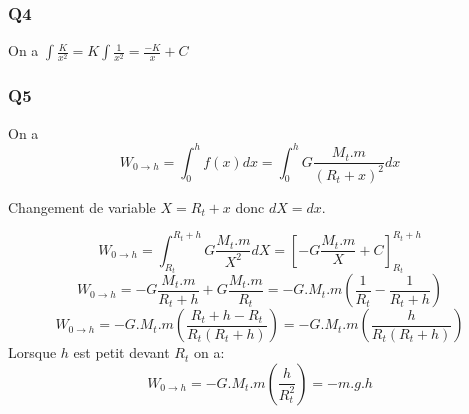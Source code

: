 \documentclass[]{book}
\theoremstyle{definition}
\begin{document}
\subsubsection{Q4}
On a $\int \frac{K}{x^2} = K \int \frac{1}{x^2} = \frac{-K}{x} + C$

\subsubsection{Q5}
On a 
$$W_{0 \to h} = \int_{0}^{h} f(x)dx = \int_{0}^{h} G\frac{M_t.m}{(R_t+x)^2} dx$$

Changement de variable $X=R_t+x$ donc $dX = dx$.

$$W_{0 \to h} = \int_{R_t}^{R_t+h} G\frac{M_t.m}{X^2} dX = [-G\frac{M_t.m}{X} + C]_{R_t}^{R_t+h}$$
$$W_{0 \to h} = -G\frac{M_t.m}{R_t+h} + G\frac{M_t.m}{R_t} = -G.M_t.m(\frac{1}{R_t} - \frac{1}{R_t+h})$$
$$W_{0 \to h} =  -G.M_t.m(\frac{R_t+h -R_t}{R_t(R_t+h)}) = -G.M_t.m(\frac{h}{R_t(R_t+h)})$$
Lorsque $h$ est petit devant $R_t$ on a:
$$W_{0 \to h} =  -G.M_t.m(\frac{h}{R_t^2}) = -m.g.h$$
\end{document}
